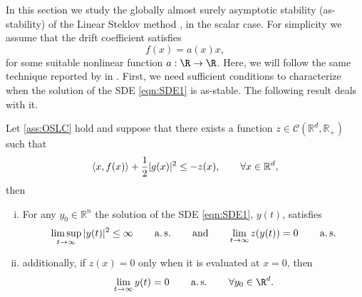 	In this section we study the globally almost surely asymptotic stability (as-stability) of the 
Linear Steklov  method , in the scalar case.
For simplicity we assume that the drift coefficient satisfies
$$
	f(x) = a(x)x,
$$
for some suitable nonlinear function $a:\R \to \R$.
Here, we will follow the same technique reported by \citeauthor*{Mao2013} in \cite{Mao2013}.
First, we need sufficient conditions to characterize when the solution of the SDE \eqref{eqn:SDE1} is as-stable. 
The following result deals with it.

\begin{thm}
	Let \cref{ass:OSLC} hold and suppose that there exists a function $z\in \mathcal{C}(\mathbb{R}^d,\mathbb{R}_+)$
	such that
	\begin{equation*}
		\left\langle x, f(x)\right\rangle +
		\frac{1}{2}|g(x)|^2\leq -z(x), \qquad \forall x\in \mathbb{R}^d,
	\end{equation*}
	then 
	\begin{enumerate}[(i)]
		\item
			For any $y_0\in \mathbb{R}^n$ the solution of the SDE \eqref{eqn:SDE1}, $y(t)$, satisfies
			\begin{equation*}
				\limsup_{t\to \infty}
					|y(t)|^2 \leq \infty \qquad \operatorname*{a.s.} \qquad \text{and} \qquad 
					\lim_{t\to \infty} z(y(t))= 0 \qquad \operatorname*{a.s.}
			\end{equation*}
		\item
			additionally, if $z(x)=0$ only when it is evaluated at $x=0$, then
			\begin{equation*}
				\lim_{t\to \infty} y(t)=0 \qquad \as \qquad \forall y_0\in \R^d.
			\end{equation*}
	\end{enumerate}
\end{thm}

